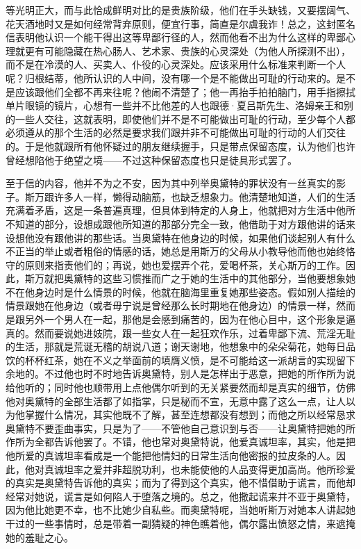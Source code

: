 等光明正大，而与此恰成鲜明对比的是贵族阶级，他们在手头缺钱，又要摆阔气、花天酒地时又是如何经常背弃原则，便宜行事，简直是尔虞我诈！总之，这封匿名信表明他认识一个能干得出这等卑鄙行径的人，然而他看不出为什么这样的卑鄙心理就更有可能隐藏在热心肠人、艺术家、贵族的心灵深处（为他人所探测不出），而不是在冷漠的人、买卖人、仆役的心灵深处。应该采用什么标准来判断一个人呢？归根结蒂，他所认识的人中间，没有哪一个是不能做出可耻的行动来的。是不是应该跟他们全都不再来往呢？他闹不清楚了；他一再抬手拍拍脑门，用手指擦拭单片眼镜的镜片，心想有一些并不比他差的人也跟德·夏吕斯先生、洛姆亲王和别的一些人交往，这就表明，即使他们并不是不可能做出可耻的行动，至少每个人都必须遵从的那个生活的必然是要求我们跟并非不可能做出可耻的行动的人们交往的。于是他就跟所有他怀疑过的朋友继续握手，只是带点保留态度，认为他们也许曾经想陷他于绝望之境——不过这种保留态度也只是徒具形式罢了。
\par 至于信的内容，他并不为之不安，因为其中列举奥黛特的罪状没有一丝真实的影子。斯万跟许多人一样，懒得动脑筋，也缺乏想象力。他清楚地知道，人们的生活充满着矛盾，这是一条普遍真理，但具体到特定的人身上，他就把对方生活中他所不知道的部分，设想成跟他所知道的那部分完全一致，他借助于对方跟他讲的话来设想他没有跟他讲的那些话。当奥黛特在他身边的时候，如果他们谈起别人有什么不正当的举止或者粗俗的情感的话，她总是用斯万的父母从小教导他而他也始终恪守的原则来指责他们的；再说，她也爱摆弄个花，爱喝杯茶，关心斯万的工作。因此，斯万就把奥黛特的这些习惯推而广之于她的生活中的其他部分，当他要想象她不在他身边时是什么情景的时候，他就在脑海里重复她那些姿态。假如别人描绘的情景跟她在他身边（或者毋宁说是曾经那么长时期地在他身边）的情景一样，然而是跟另外一个男人在一起，那他是会感到痛苦的，因为在他心目中，这个形象是逼真的。然而要说她进妓院，跟一些女人在一起狂欢作乐，过着卑鄙下流、荒淫无耻的生活，那就是荒诞无稽的胡说八道；谢天谢地，他想象中的朵朵菊花，她每日品饮的杯杯红茶，她在不义之举面前的填膺义愤，是不可能给这一派胡言的实现留下余地的。不过他也时不时地告诉奥黛特，别人是怎样出于恶意，把她的所作所为说给他听的；同时他也顺带用上点他偶尔听到的无关紧要然而却是真实的细节，仿佛他对奥黛特的全部生活都了如指掌，只是秘而不宣，无意中露了这么一点，让人以为他掌握什么情况，其实他既不了解，甚至连想都没有想到；而他之所以经常恳求奥黛特不要歪曲事实，只是为了——不管他自己意识到与否——让奥黛特把她的所作所为全都告诉他罢了。不错，他也常对奥黛特说，他爱真诚坦率，其实，他是把他所爱的真诚坦率看成是一个能把他情妇的日常生活向他密报的拉皮条的人。因此，他对真诚坦率之爱并非超脱功利，也未能使他的人品变得更加高尚。他所珍爱的真实是奥黛特告诉他的真实；而为了得到这个真实，他不惜借助于谎言，而他却经常对她说，谎言是如何陷人于堕落之境的。总之，他撒起谎来并不亚于奥黛特，因为他比她更不幸，也不比她少自私些。而奥黛特呢，当她听斯万对她本人讲起她干过的一些事情时，总是带着一副猜疑的神色瞧着他，偶尔露出愤怒之情，来遮掩她的羞耻之心。

